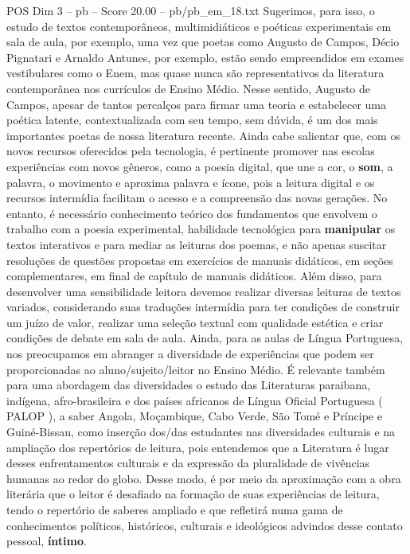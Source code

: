 \begin{textsample}{POS Dim 3 – pb – Score 20.00 – pb/pb\_em\_18.txt}
Sugerimos, para isso, o estudo de textos contemporâneos, multimidiáticos e poéticas experimentais em sala de aula, por exemplo, uma vez que poetas como Augusto de Campos, Décio Pignatari e Arnaldo Antunes, por exemplo, estão sendo empreendidos em exames vestibulares como o Enem, mas quase nunca são representativos da literatura contemporânea nos currículos de Ensino Médio.
Nesse sentido, Augusto de Campos, apesar de tantos percalços para firmar uma teoria e estabelecer uma poética latente, contextualizada com seu tempo, sem dúvida, é um dos mais importantes poetas de nossa literatura recente.
Ainda cabe salientar que, com os novos recursos oferecidos pela tecnologia, é pertinente promover nas escolas experiências com novos gêneros, como a poesia digital, que une a cor, o \textbf{som}, a palavra, o movimento e aproxima palavra e ícone, pois a leitura digital e os recursos intermídia facilitam o acesso e a compreensão das novas gerações.
No entanto, é necessário conhecimento teórico dos fundamentos que envolvem o trabalho com a poesia experimental, habilidade tecnológica para \textbf{manipular} os textos interativos e para mediar as leituras dos poemas, e não apenas suscitar resoluções de questões propostas em exercícios de manuais didáticos, em seções complementares, em final de capítulo de manuais didáticos.
Além disso, para desenvolver uma sensibilidade leitora devemos realizar diversas leituras de textos variados, considerando suas traduções intermídia para ter condições de construir um juízo de valor, realizar uma seleção textual com qualidade estética e criar condições de debate em sala de aula.
Ainda, para as aulas de Língua Portuguesa, nos preocupamos em abranger a diversidade de experiências que podem ser proporcionadas ao aluno/sujeito/leitor no Ensino Médio.
É relevante também para uma abordagem das diversidades o estudo das Literaturas paraibana, indígena, afro-brasileira e dos países africanos de Língua Oficial Portuguesa ( PALOP ), a saber Angola, Moçambique, Cabo Verde, São Tomé e Príncipe e Guiné-Bissau, como inserção dos/das estudantes nas diversidades culturais e na ampliação dos repertórios de leitura, pois entendemos que a Literatura é lugar desses enfrentamentos culturais e da expressão da pluralidade de vivências humanas ao redor do globo.
Desse modo, é por meio da aproximação com a obra literária que o leitor é desafiado na formação de suas experiências de leitura, tendo o repertório de saberes ampliado e que refletirá numa gama de conhecimentos políticos, históricos, culturais e ideológicos advindos desse contato pessoal, \textbf{íntimo}.

\end{textsample}

